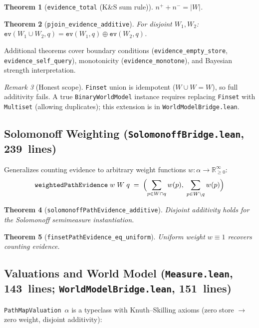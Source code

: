 \documentclass[11pt]{article}
\newtheorem{theorem}{Theorem}[section]
\theoremstyle{definition}
\theoremstyle{remark}
\newtheorem{remark}[theorem]{Remark}
\begin{document}
\begin{theorem}[\texttt{evidence\_total} (K\&S sum rule)]
$n^+ + n^- = \lvert W \rvert$.
\end{theorem}

\begin{theorem}[\texttt{pjoin\_evidence\_additive}]
For disjoint $W_1, W_2$:
$\texttt{ev}(W_1 \cup W_2, q) = \texttt{ev}(W_1, q) \oplus \texttt{ev}(W_2, q)$.
\end{theorem}

\noindent
Additional theorems cover boundary conditions (\texttt{evidence\_empty\_store},
\texttt{evidence\_self\_query}), monotonicity (\texttt{evidence\_monotone}),
and Bayesian strength interpretation.

\begin{remark}[Honest scope]
\texttt{Finset} union is idempotent ($W \cup W = W$), so full additivity
fails.  A true \texttt{BinaryWorldModel} instance requires replacing
\texttt{Finset} with \texttt{Multiset} (allowing duplicates); this
extension is in \texttt{WorldModelBridge.lean}.
\end{remark}

\subsection{Solomonoff Weighting (\texttt{SolomonoffBridge.lean}, 239~lines)}

Generalizes counting evidence to arbitrary weight functions
$w : \alpha \to \mathbb{R}_{\ge 0}^{\infty}$:
\[
  \texttt{weightedPathEvidence}\;w\;W\;q \;=\;
  \Bigl(\sum_{p \in W \cap q} w(p),\;\sum_{p \in W \setminus q} w(p)\Bigr)
\]

\begin{theorem}[\texttt{solomonoffPathEvidence\_additive}]
Disjoint additivity holds for the Solomonoff semimeasure instantiation.
\end{theorem}

\begin{theorem}[\texttt{finsetPathEvidence\_eq\_uniform}]
Uniform weight $w \equiv 1$ recovers counting evidence.
\end{theorem}

\subsection{Valuations and World Model (\texttt{Measure.lean}, 143~lines;
\texttt{WorldModelBridge.lean}, 151~lines)}

\texttt{PathMapValuation}~$\alpha$ is a typeclass with Knuth--Skilling
axioms (zero store $\to$ zero weight, disjoint additivity):
\end{document}
